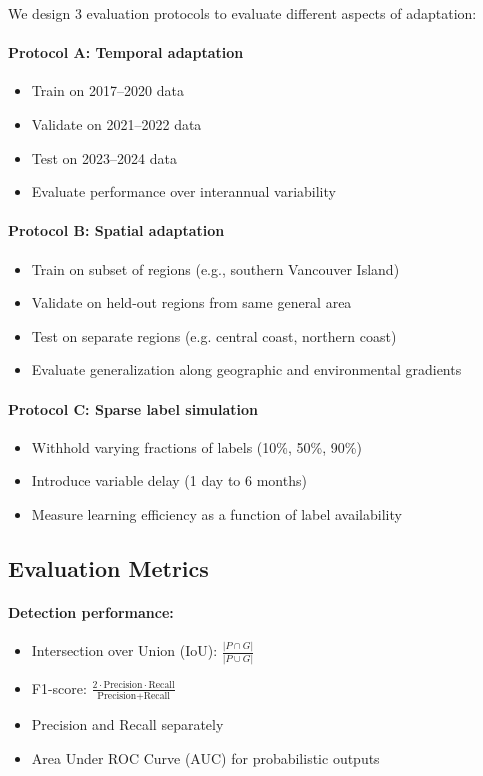 \documentclass[12pt,oneside]{book}
\begin{document}
We design 3 evaluation protocols to evaluate different aspects of adaptation:

\paragraph{Protocol A: Temporal adaptation}
\begin{itemize}
    \item Train on 2017--2020 data
    \item Validate on 2021--2022 data
    \item Test on 2023--2024 data
    \item Evaluate performance over interannual variability
\end{itemize}

\paragraph{Protocol B: Spatial adaptation}
\begin{itemize}
    \item Train on subset of regions (e.g., southern Vancouver Island)
    \item Validate on held-out regions from same general area
    \item Test on separate regions (e.g. central coast, northern coast)
    \item Evaluate generalization along geographic and environmental gradients
\end{itemize}

\paragraph{Protocol C: Sparse label simulation}
\begin{itemize}
    \item Withhold varying fractions of labels (10\%, 50\%, 90\%)
    \item Introduce variable delay (1 day to 6 months)
    \item Measure learning efficiency as a function of label availability
\end{itemize}

\subsection{Evaluation Metrics}
\label{subsec:metrics}

\paragraph{Detection performance:}
\begin{itemize}
    \item Intersection over Union (IoU): $\frac{|P \cap G|}{|P \cup G|}$
    \item F1-score: $\frac{2 \cdot \text{Precision} \cdot \text{Recall}}{\text{Precision} + \text{Recall}}$
    \item Precision and Recall separately
    \item Area Under ROC Curve (AUC) for probabilistic outputs
\end{itemize}
\end{document}
